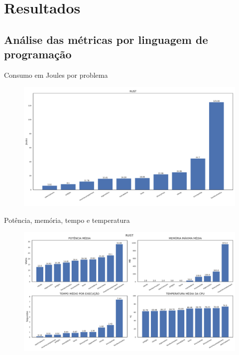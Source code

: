 \section{Resultados}

\subsection{Análise das métricas por linguagem de programação}

\begin{frame}{Consumo em Joules por problema}
    \begin{figure}
        \centering
        \includegraphics[width=0.85\linewidth]{images/rust-1.pdf}
        \label{fig:powerDomains2c3s4}
    \end{figure}
\end{frame}

\begin{frame}{Potência, memória, tempo e temperatura}
    \begin{figure}
        \centering
        \includegraphics[width=0.85\linewidth]{images/rust-2.pdf}
        \label{fig:powerDomainsrusat2c3s4}
    \end{figure}
\end{frame}

